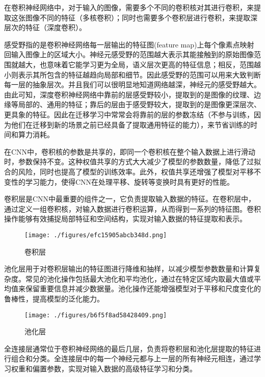


在卷积神经网络中，对于输入的图像，需要多个不同的卷积核对其进行卷积，来提取这张图像不同的特征（多核卷积）；同时也需要多个卷积层进行卷积，来提取深层次的特征（深度卷积）。

感受野指的是卷积神经网络每一层输出的特征图(feature map)上每个像素点映射回输入图像上的区域大小。神经元感受野的范围越大表示其能接触到的原始图像范围就越大，也意味着它能学习更为全局，语义层次更高的特征信息；相反，范围越小则表示其所包含的特征越趋向局部和细节。因此感受野的范围可以用来大致判断每一层的抽象层次。并且我们可以很明显地知道网络越深，神经元的感受野越大。由此可知，深度卷积神经网络中靠前的层感受野较小，提取到的是图像的纹理、边缘等局部的、通用的特征；靠后的层由于感受野较大，提取到的是图像更深层次、更具象的特征。因此在迁移学习中常常会将靠前的层的参数冻结（不参与训练，因为他们在迁移到新的场景之前已经具备了提取通用特征的能力），来节省训练的时间和算力消耗。

在CNN中，卷积核的参数是共享的，即同一个卷积核在整个输入数据上进行滑动时，参数保持不变。这种权值共享的方式大大减少了模型的参数数量，降低了过拟合的风险，同时也提高了模型的训练效率。此外，权值共享还增强了模型对平移不变性的学习能力，使得CNN在处理平移、旋转等变换时具有更好的性能。

卷积层是CNN中最重要的组件之一，它负责提取输入数据的特征。在卷积层中，通过定义一组卷积核，对输入数据进行卷积运算，从而得到一系列的特征图。卷积操作能够有效捕捉局部特征和空间结构，实现对输入数据的特征提取和表示。\begin{figure}[ht]
\centering
\texttt{[image: ./figures/efc15905abcb348d.png]}
\caption{卷积层} \label{fig_CNN3_1}
\end{figure}

池化层用于对卷积层输出的特征图进行降维和抽样，以减少模型参数数量和计算复杂度。常见的池化操作包括最大池化和平均池化，通过在特定区域内取最大值或平均值来保留重要信息并减少数据量。池化操作还能增强模型对于平移和尺度变化的鲁棒性，提高模型的泛化能力。

\begin{figure}[ht]
\centering
\texttt{[image: ./figures/b6f5f8ad58428409.png]}
\caption{池化层} \label{fig_CNN3_2}
\end{figure}

全连接层通常位于卷积神经网络的最后几层，负责将卷积层和池化层提取的特征进行组合和分类。全连接层中的每一个神经元都与上一层的所有神经元相连，通过学习权重和偏置参数，实现对输入数据的高级特征学习和分类。



